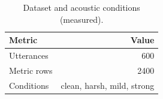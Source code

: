\begin{table}[t]
\centering
\caption{Dataset and acoustic conditions (measured).}
\label{tab:dataset}
\begin{tabular}{lr}
\toprule
Metric & Value \\
\midrule
Utterances & 600 \\
Metric rows & 2400 \\
Conditions & clean, harsh, mild, strong \\
\bottomrule
\end{tabular}
\end{table}
